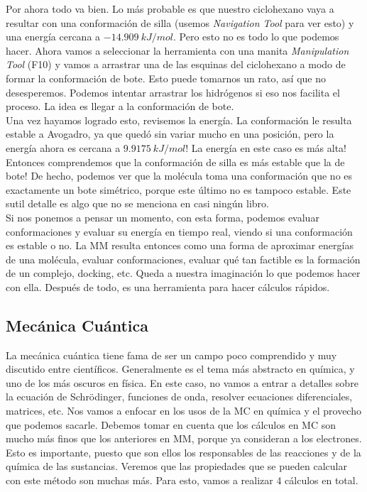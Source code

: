 \documentclass[10pt,letterpaper]{article}
\begin{document}
Por ahora todo va bien. Lo m\'as probable es que nuestro ciclohexano vaya a resultar con una conformaci\'on de silla (usemos \emph{Navigation Tool} para ver esto) y una energ\'ia cercana a $-14.909\ kJ/mol$. Pero esto no es todo lo que podemos hacer. Ahora vamos a seleccionar la herramienta con una manita \emph{Manipulation Tool} (F10) y vamos a arrastrar una de las esquinas del ciclohexano a modo de formar la conformaci\'on de bote. Esto puede tomarnos un rato, as\'i que no desesperemos. Podemos intentar arrastrar los hidr\'ogenos si eso nos facilita el proceso. La idea es llegar a la conformaci\'on de bote.\\

Una vez hayamos logrado esto, revisemos la energ\'ia. La conformaci\'on le resulta estable a Avogadro, ya que qued\'o sin variar mucho en una posici\'on, pero la energ\'ia ahora es cercana a $9.9175\ kJ/mol$! La energ\'ia en este caso es m\'as alta! Entonces comprendemos que la conformaci\'on de silla es m\'as estable que la de bote! De hecho, podemos ver que la mol\'ecula toma una conformaci\'on que no es exactamente un bote sim\'etrico, porque este \'ultimo no es tampoco estable. Este sutil detalle es algo que no se menciona en casi ning\'un libro.\\

Si nos ponemos a pensar un momento, con esta forma, podemos evaluar conformaciones y evaluar su energ\'ia en tiempo real, viendo si una conformaci\'on es estable o no. La MM resulta entonces como una forma de aproximar energ\'ias de una mol\'ecula, evaluar conformaciones, evaluar qu\'e tan factible es la formaci\'on de un complejo, docking, etc. Queda a nuestra imaginaci\'on lo que podemos hacer con ella. Despu\'es de todo, es una herramienta para hacer c\'alculos r\'apidos.

\subsection{Mec\'anica Cu\'antica}
La mec\'anica cu\'antica tiene fama de ser un campo poco comprendido y muy discutido entre cient\'ificos. Generalmente es el tema m\'as abstracto en qu\'imica, y uno de los m\'as oscuros en f\'isica. En este caso, no vamos a entrar a detalles sobre la ecuaci\'on de Schr\"odinger, funciones de onda, resolver ecuaciones diferenciales, matrices, etc. Nos vamos a enfocar en los usos de la MC en qu\'imica y el provecho que podemos sacarle. Debemos tomar en cuenta que los c\'alculos en MC son mucho m\'as finos que los anteriores en MM, porque ya consideran a los electrones. Esto es importante, puesto que son ellos los responsables de las reacciones y de la qu\'imica de las sustancias. Veremos que las propiedades que se pueden calcular con este m\'etodo son muchas m\'as. Para esto, vamos a realizar 4 c\'alculos en total.\\
\end{document}
